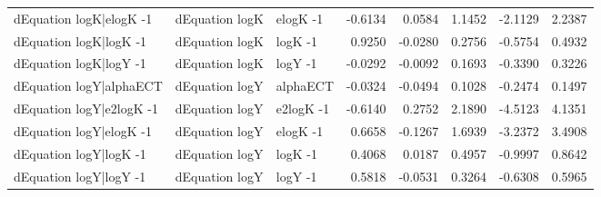 \begin{table}[!h]
\begin{tabular}[t]{lllrrrrr}
dEquation logK|elogK -1 & dEquation logK & elogK -1 & -0.6134 & 0.0584 & 1.1452 & -2.1129 & 2.2387\\
dEquation logK|logK -1 & dEquation logK & logK -1 & 0.9250 & -0.0280 & 0.2756 & -0.5754 & 0.4932\\
dEquation logK|logY -1 & dEquation logK & logY -1 & -0.0292 & -0.0092 & 0.1693 & -0.3390 & 0.3226\\
\addlinespace
dEquation logY|alphaECT & dEquation logY & alphaECT & -0.0324 & -0.0494 & 0.1028 & -0.2474 & 0.1497\\
dEquation logY|e2logK -1 & dEquation logY & e2logK -1 & -0.6140 & 0.2752 & 2.1890 & -4.5123 & 4.1351\\
dEquation logY|elogK -1 & dEquation logY & elogK -1 & 0.6658 & -0.1267 & 1.6939 & -3.2372 & 3.4908\\
dEquation logY|logK -1 & dEquation logY & logK -1 & 0.4068 & 0.0187 & 0.4957 & -0.9997 & 0.8642\\
dEquation logY|logY -1 & dEquation logY & logY -1 & 0.5818 & -0.0531 & 0.3264 & -0.6308 & 0.5965\\
\bottomrule
\end{tabular}
\end{table}
